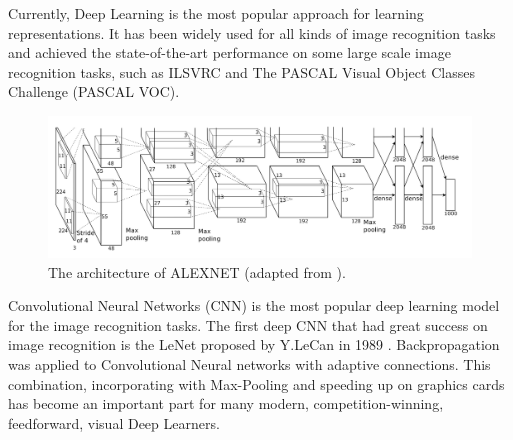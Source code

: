 Currently, Deep Learning is the most popular approach for learning representations. It has been widely used for all kinds of image recognition tasks and achieved the state-of-the-art performance on some large scale image recognition tasks, such as ILSVRC and The PASCAL Visual Object Classes Challenge (PASCAL VOC). 
\begin{figure}
	\centering
	\includegraphics[scale=.3]{introduction/fig/alexnet.png}
	\caption{The architecture of ALEXNET (adapted from \cite{krizhevsky2012imagenet}).}\label{fig:intro:alex}
\end{figure}

Convolutional Neural Networks (CNN) is the most popular deep learning model for the image recognition tasks. The first deep CNN that had great success on image recognition is the LeNet proposed by Y.LeCan in 1989 \cite{lecun1989backpropagation}. Backpropagation was applied to Convolutional Neural networks with adaptive connections. This combination, incorporating with Max-Pooling and speeding up on graphics cards has become an important part for  many modern, competition-winning, feedforward, visual Deep Learners. 

